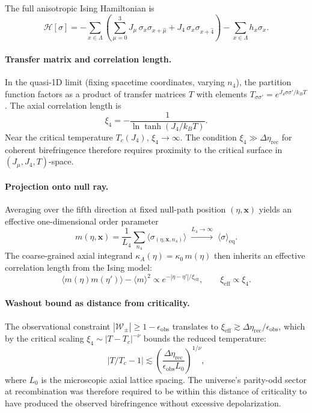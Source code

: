 \documentclass[12pt]{article}
\theoremstyle{definition}
\newcommand{\kA}{\kappa_A}
\newcommand{\Wrec}{\Delta\eta_{\mathrm{rec}}}
\newcommand{\Wpm}{\mathcal{W}_\pm}
\begin{document}
The full anisotropic Ising Hamiltonian is
\begin{equation}
  \mathcal{H}[\sigma]
  = -\sum_{x\in\Lambda}
    \left(
      \sum_{\mu=0}^{3} J_\mu\,\sigma_x\sigma_{x+\hat\mu}
      + J_4\,\sigma_x\sigma_{x+\hat4}
    \right)
  -\sum_{x\in\Lambda} h_x\sigma_x.
\end{equation}

\paragraph{Transfer matrix and correlation length.}
In the quasi-1D limit (fixing spacetime coordinates, varying $n_4$),
the partition function factors as a product of transfer matrices $T$
with elements $T_{\sigma\sigma'}=e^{J_4\sigma\sigma'/k_BT}$.
The axial correlation length is
\begin{equation}
  \xi_4 = -\frac{1}{\ln\tanh(J_4/k_BT)}.
\end{equation}
Near the critical temperature $T_c(J_4)$, $\xi_4\to\infty$.
The condition $\xi_4\gg\Wrec$ for coherent birefringence therefore
requires proximity to the critical surface in $(J_\mu,J_4,T)$-space.

\paragraph{Projection onto null ray.}
Averaging over the fifth direction at fixed null-path position $(\eta,\mathbf{x})$
yields an effective one-dimensional order parameter
\begin{equation}
  m(\eta,\mathbf{x})
  = \frac{1}{L_4}\sum_{n_4}\langle\sigma_{(\eta,\mathbf{x},n_4)}\rangle
  \;\xrightarrow{L_4\to\infty}\;
  \langle\sigma\rangle_{\mathrm{eq}}.
\end{equation}
The coarse-grained axial integrand $\kA(\eta)=\kappa_0\,m(\eta)$ then
inherits an effective correlation length from the Ising model:
\begin{equation}
  \langle m(\eta)m(\eta')\rangle
  - \langle m\rangle^2
  \propto e^{-|\eta-\eta'|/\xi_{\mathrm{eff}}},
  \qquad
  \xi_{\mathrm{eff}}\propto\xi_4.
\end{equation}

\paragraph{Washout bound as distance from criticality.}
The observational constraint $|\Wpm|\geq1-\epsilon_{\mathrm{obs}}$
translates to $\xi_{\mathrm{eff}}\gtrsim\Wrec/\epsilon_{\mathrm{obs}}$,
which by the critical scaling $\xi_4\sim|T-T_c|^{-\nu}$ bounds
the reduced temperature:
\begin{equation}
  |T/T_c-1|
  \lesssim
  \left(\frac{\Wrec}{\epsilon_{\mathrm{obs}}L_0}\right)^{1/\nu},
\end{equation}
where $L_0$ is the microscopic axial lattice spacing.
The universe's parity-odd sector at recombination was therefore required
to be within this distance of criticality to have produced the observed
birefringence without excessive depolarization.
\end{document}
